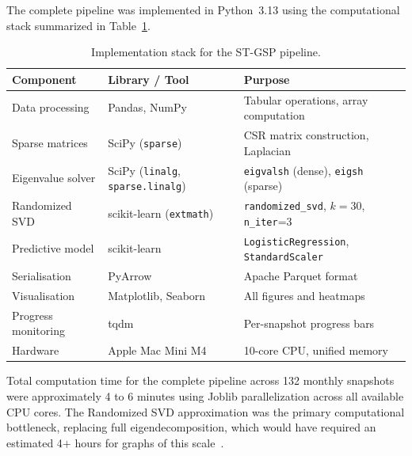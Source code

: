 \documentclass[a4paper,fleqn]{cas-dc}
\begin{document}
The complete pipeline was implemented in Python~3.13 using the
computational stack summarized in Table~\ref{tab:implementation}.

\begin{table}[htbp]
\centering
\caption{Implementation stack for the ST-GSP pipeline.}
\label{tab:implementation}
\begin{tabular}{lll}
\toprule
\textbf{Component} & \textbf{Library / Tool}
& \textbf{Purpose} \\
\midrule
Data processing    & Pandas, NumPy
    & Tabular operations, array computation \\
Sparse matrices    & SciPy (\texttt{sparse})
    & CSR matrix construction, Laplacian \\
Eigenvalue solver  & SciPy (\texttt{linalg}, \texttt{sparse.linalg})
    & \texttt{eigvalsh} (dense), \texttt{eigsh} (sparse) \\
Randomized SVD     & scikit-learn (\texttt{extmath})
    & \texttt{randomized\_svd}, $k{=}30$, \texttt{n\_iter}{=}3 \\
Predictive model   & scikit-learn
    & \texttt{LogisticRegression}, \texttt{StandardScaler} \\
Serialisation      & PyArrow
    & Apache Parquet format \\
Visualisation      & Matplotlib, Seaborn
    & All figures and heatmaps \\
Progress monitoring & tqdm
    & Per-snapshot progress bars \\
Hardware           & Apple Mac Mini M4
    & 10-core CPU, unified memory \\
\bottomrule
\end{tabular}
\end{table}

\noindent Total computation time for the complete pipeline across 132
monthly snapshots were approximately 4 to 6 minutes using Joblib
parallelization across all available CPU cores. The Randomized SVD
approximation was the primary computational bottleneck, replacing full eigendecomposition, which would have required an estimated 4$+$ hours for graphs of this scale~\cite{25_Halko2011}.

\end{document}
